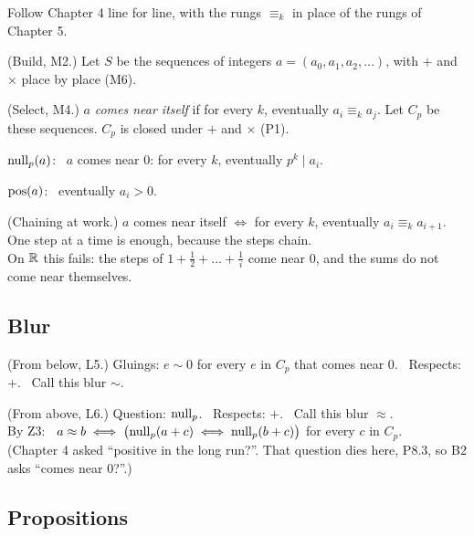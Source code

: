 Follow Chapter 4 line for line, with the rungs $\equiv_k$ in place of the rungs of Chapter 5.
\begin{lines}
\item[\lab{D2}] (Build, M2.) Let $S$ be the sequences of integers $a = (a_0, a_1, a_2, \dots)$, with $+$ and $\times$ place by place (M6).
\item[\lab{D3}] (Select, M4.) $a$ \emph{comes near itself} if for every $k$, eventually $a_i \equiv_k a_j$. Let $C_p$ be these sequences. $C_p$ is closed under $+$ and $\times$ (P1).
\item[\lab{D4}] $\operatorname{null}_p(a)$: \ $a$ comes near $0$: for every $k$, eventually $p^k \mid a_i$.
\item[\lab{D5}] $\operatorname{pos}(a)$: \ eventually $a_i > 0$.
\end{lines}

\begin{lines}
\item[\lab{P4}] (Chaining at work.) $a$ comes near itself $\iff$ for every $k$, eventually $a_i \equiv_k a_{i+1}$. One step at a time is enough, because the steps chain. \\
On $\mathbb{R}$ this fails: the steps of $1 + \tfrac12 + \dots + \tfrac1i$ come near $0$, and the sums do not come near themselves.
\end{lines}

\subsection*{Blur}

\begin{lines}
\item[\lab{B1}] (From below, L5.) Gluings: $e \sim 0$ for every $e$ in $C_p$ that comes near $0$. \ Respects: $+$. \ Call this blur $\sim$.
\item[\lab{B2}] (From above, L6.) Question: $\operatorname{null}_p$. \ Respects: $+$. \ Call this blur $\approx$. \\
By Z3: \ $a \approx b \iff \bigl(\operatorname{null}_p(a + c) \iff \operatorname{null}_p(b + c)\bigr)$ for every $c$ in $C_p$. \\
(Chapter 4 asked ``positive in the long run?''. That question dies here, P8.3, so B2 asks ``comes near $0$?''.)
\end{lines}

\subsection*{Propositions}

